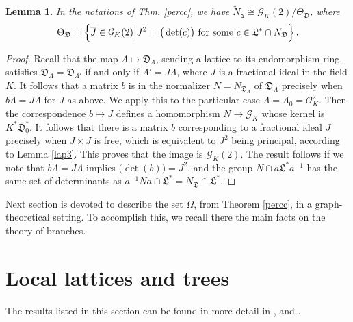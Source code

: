 \documentclass{article}
\newtheorem{Lem}[Prop]{Lemma}
\theoremstyle{definition}
\theoremstyle{remark}
\begin{document}
\begin{Lem}\label{Lemcc}
    In the notations of Thm. \ref{percc}, we have
    $\tilde{N}_\mathtt{a}\cong\mathcal{G}_K(2)/\Theta_{\mathfrak{D}}$,
     where 
     $$\Theta_{\mathfrak{D}}=
     \left\{\overline{J}\in\mathcal{G}_K(2)\Big|J^2=
     \big(\det(c)\big)\textnormal{ for some } 
     c\in \mathfrak{L}^*\cap N_{\mathfrak{D}}\right\}.$$ 
\end{Lem}

\begin{proof}
    Recall that the map $\Lambda\mapsto\mathfrak{D}_\Lambda$,
    sending a lattice to its endomorphism ring, satisfies
    $\mathfrak{D}_\Lambda=\mathfrak{D}_{\Lambda'}$
    if and only if $\Lambda'=J\Lambda$, where $J$ is a fractional 
    ideal in the field $K$. It follows that a matrix $b$
    is in the normalizer $N=N_{\mathfrak{D}_\Lambda}$ of 
    $\mathfrak{D}_\Lambda$ precisely when 
    $b\Lambda=J\Lambda$ for $J$ as above. We apply this to the
    particular case $\Lambda=\Lambda_0=\mathcal{O}_K^2$. Then
    the correspondence $b\mapsto J$ defines a homomorphism
    $N\rightarrow \mathcal{G}_K$ whose kernel is 
    $K^*\mathfrak{D}_0^*$. It follows that there is 
    a matrix $b$
    corresponding to a fractional ideal $J$ precisely when
    $J\times J$ is free, which is equivalent to $J^2$ being 
    principal, according to Lemma \ref{lap3}. 
    This proves that the image is $\mathcal{G}_K(2)$.
    The result follows if we note that
    $b\Lambda=J\Lambda$ implies $\big(\det(b)\big)=J^2$,
    and the group $N\cap a\mathfrak{L}^*a^{-1}$ 
    has the same set of determinants
    as  $a^{-1}Na\cap \mathfrak{L}^*=
    N_{\mathfrak{D}}\cap \mathfrak{L}^*$.    
\end{proof}

Next section is devoted to describe the set $\Omega$, from 
Theorem \ref{percc}, in a graph-theoretical setting. 
To accomplish this, we recall there the main facts on the
theory of branches.


\section{Local lattices and trees}\label{S5B}

The results listed in this section can be found in more detail in
\cite{A13}, \cite{AAC18} and \cite{AB19}.
\end{document}
